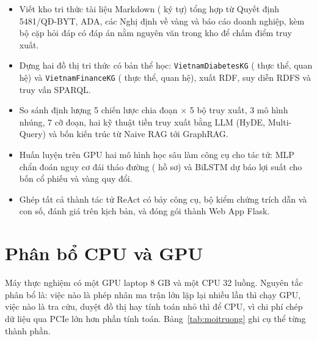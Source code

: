 \begin{itemize}
  \item Viết kho tri thức  tài liệu Markdown ( ký tự) tổng
        hợp từ Quyết định 5481/QĐ-BYT, ADA, các Nghị định về vàng và báo cáo doanh nghiệp, kèm bộ
         cặp hỏi đáp có đáp án nằm nguyên văn trong kho để chấm điểm truy xuất.
  \item Dựng hai đồ thị tri thức có bản thể học: \texttt{VietnamDiabetesKG} ( thực thể,
         quan hệ) và \texttt{VietnamFinanceKG} ( thực thể,
         quan hệ), xuất RDF, suy diễn RDFS và truy vấn SPARQL.
  \item So sánh định lượng 5 chiến lược chia đoạn $\times$ 5 bộ truy xuất, 3 mô hình nhúng, 7 cỡ đoạn,
        hai kỹ thuật tiền truy xuất bằng LLM (HyDE, Multi-Query) và bốn kiến trúc từ Naive RAG tới GraphRAG.
  \item Huấn luyện trên GPU hai mô hình học sâu làm công cụ cho tác tử: MLP chẩn đoán nguy cơ đái tháo đường
        ( hồ sơ) và BiLSTM dự báo lợi suất cho bốn cổ phiếu và vàng quy đổi.
  \item Ghép tất cả thành tác tử ReAct có bảy công cụ, bộ kiểm chứng trích dẫn và con số, đánh giá trên
         kịch bản, và đóng gói thành Web App Flask.
\end{itemize}

\section*{Phân bổ CPU và GPU}
Máy thực nghiệm có một GPU laptop 8 GB và một CPU 32 luồng. Nguyên tắc phân bổ là: việc nào là phép nhân ma
trận lớn lặp lại nhiều lần thì chạy GPU, việc nào là tra cứu, duyệt đồ thị hay tính toán nhỏ thì để CPU, vì chi
phí chép dữ liệu qua PCIe lớn hơn phần tính toán. Bảng~\ref{tab:moitruong} ghi cụ thể từng thành phần.


